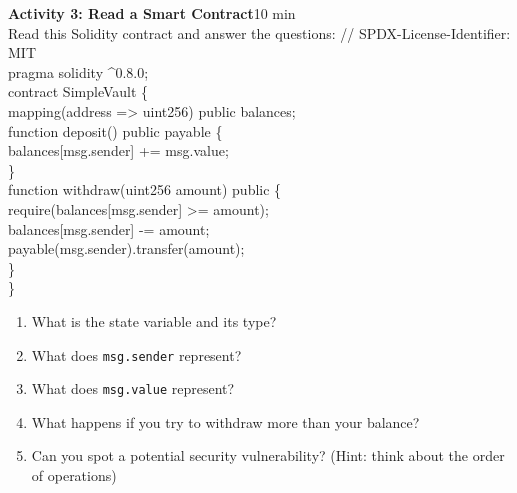 \documentclass[11pt,a4paper]{article}
\newcommand{\activitybox}[3]{%
  \noindent\colorbox{mllavender4}{\parbox{\dimexpr\linewidth-2\fboxsep}{%
    \textbf{\color{mlpurple}#1}\hfill\textcolor{mlgray}{\small #2}\\[2pt]#3%
  }}\par\vspace{4pt}%
}
\begin{document}
\vspace{2pt}

\activitybox{Activity 3: Read a Smart Contract}{10 min}{%
Read this Solidity contract and answer the questions:
\vspace{2pt}
\noindent\ttfamily\small
// SPDX-License-Identifier: MIT\\
pragma solidity \textasciicircum{}0.8.0;\\[2pt]
contract SimpleVault \{\\
\hspace*{1.5em}mapping(address => uint256) public balances;\\[2pt]
\hspace*{1.5em}function deposit() public payable \{\\
\hspace*{3em}balances[msg.sender] += msg.value;\\
\hspace*{1.5em}\}\\[2pt]
\hspace*{1.5em}function withdraw(uint256 amount) public \{\\
\hspace*{3em}require(balances[msg.sender] >= amount);\\
\hspace*{3em}balances[msg.sender] -= amount;\\
\hspace*{3em}payable(msg.sender).transfer(amount);\\
\hspace*{1.5em}\}\\
\}
\rmfamily\normalsize\par\vspace{2pt}
\begin{enumerate}
\item What is the state variable and its type?
\item What does \texttt{msg.sender} represent?
\item What does \texttt{msg.value} represent?
\item What happens if you try to withdraw more than your balance?
\item Can you spot a potential security vulnerability? (Hint: think about the order of operations)
\end{enumerate}
}

\vspace{2pt}
\end{document}
